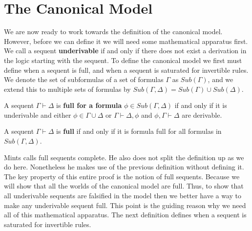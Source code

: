 \documentclass{article}
\begin{document}


\section{The Canonical Model}
\label{sec:the_canonical_model}
We are now ready to work towards the definition of the canonical
model. However, before we can define it we will need some mathematical
apparatus first. We call a sequent \textbf{underivable} if and only if
there does not exist a derivation in the logic starting with the
sequent. To define the canonical model we first must define when a
sequent is full, and when a sequent is saturated for invertible rules.
We denote the set of subformulas of a set of formulas $\Gamma$ as
$Sub(\Gamma)$, and we extend this to multiple sets of formulas by
$Sub(\Gamma,\Delta) = Sub(\Gamma) \cup Sub(\Delta)$.

\begin{definition}
  \label{def:full_sequent_formula}  
  A sequent $\Gamma \vdash \Delta$ is \textbf{full for a formula} $\phi \in Sub(\Gamma,\Delta)$ if and only if 
  it is underivable and either $\phi \in \Gamma \cup \Delta$ or $\Gamma \vdash \Delta,\phi$ and $\phi,\Gamma \vdash \Delta$
  are derivable.
\end{definition}

\begin{definition}
  \label{def:full_sequent}
  A sequent $\Gamma \vdash \Delta$ is \textbf{full} if and only if it is formula full for all formulas in 
  $Sub(\Gamma,\Delta)$.
\end{definition}
Mints calls full sequents complete.  He also does not split the definition up as we do here.  Nonetheless he makes use
of the previous definition without defining it.  The key property of this entire proof is the notion of full sequents.
Because we will show that all the worlds of the canonical model are full.  Thus, to show that all underivable sequents
are falsified in the model then we better have a way to make any underivable sequent full.  This point is the guiding 
reason why we need all of this mathematical apparatus.  The next definition defines when a sequent is saturated for
invertible rules.  
\end{document}
